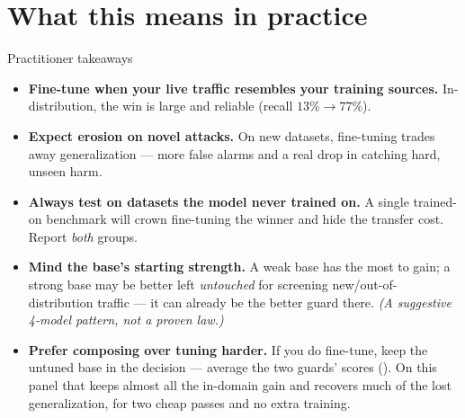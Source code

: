 \documentclass[11pt]{article}
\begin{document}
\section{What this means in practice}
\begin{takeaway}{Practitioner takeaways}
\small
\begin{itemize}
\item \textbf{Fine-tune when your live traffic resembles your training sources.}
In-distribution, the win is large and reliable (recall $13\%\!\to\!77\%$).
\item \textbf{Expect erosion on novel attacks.} On new datasets, fine-tuning trades away
generalization --- more false alarms and a real drop in catching hard, unseen harm.
\item \textbf{Always test on datasets the model never trained on.} A single trained-on
benchmark will crown fine-tuning the winner and hide the transfer cost. Report \emph{both}
groups.
\item \textbf{Mind the base's starting strength.} A weak base has the most to gain; a strong
base may be better left \emph{untouched} for screening new/out-of-distribution traffic --- it
can already be the better guard there. \emph{(A suggestive 4-model pattern, not a proven law.)}
\item \textbf{Prefer composing over tuning harder.} If you do fine-tune, keep the untuned base
in the decision --- average the two guards' scores (). On this panel that keeps
almost all the in-domain gain and recovers much of the lost generalization, for two cheap passes
and no extra training.
\end{itemize}
\end{takeaway}

\end{document}
